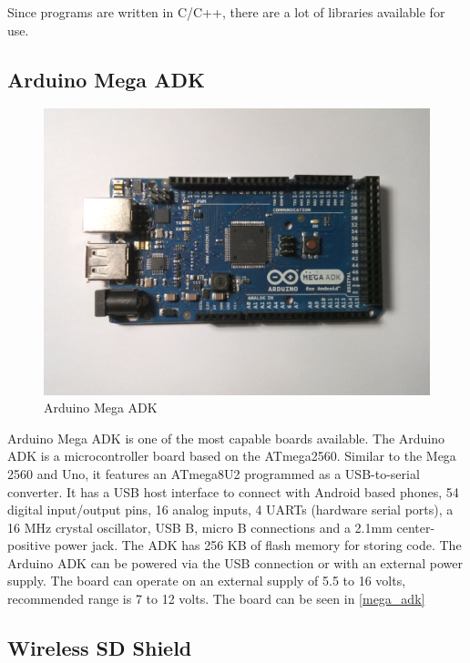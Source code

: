 Since programs are written in C/C++, there are a lot of libraries available for use. 

\subsection{Arduino Mega ADK}

\begin{figure}[h!]
\centering
\includegraphics[scale=0.58]{2/figures/mega_adk.pdf}
\caption{Arduino Mega ADK}
\label{mega_adk}
\end{figure}

Arduino Mega ADK \cite{megaAdk} is one of the most capable boards available. 
The Arduino ADK is a microcontroller board based on the ATmega2560. Similar to the Mega 2560 and Uno, it features an ATmega8U2 programmed as a USB-to-serial converter. It has a USB host interface to connect with Android based phones, 54 digital input/output pins, 16 analog inputs, 4 UARTs (hardware serial ports), a 16 MHz crystal oscillator, USB B, micro B connections and a 2.1mm center-positive power jack. The ADK has 256 KB of flash memory for storing code. The Arduino ADK can be powered via the USB connection or with an external power supply. The board can operate on an external supply of 5.5 to 16 volts, recommended range is 7 to 12 volts. The board can be seen in \autoref{mega_adk}

\subsection{Wireless SD Shield}

